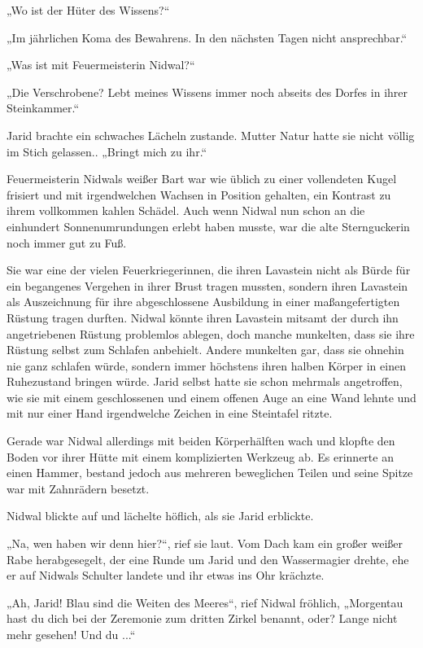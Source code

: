 „Wo ist der Hüter des Wissens?“

„Im jährlichen Koma des Bewahrens. In den nächsten Tagen nicht ansprechbar.“

„Was ist mit Feuermeisterin Nidwal?“

„Die Verschrobene? Lebt meines Wissens immer noch abseits des Dorfes in ihrer Steinkammer.“

Jarid brachte ein schwaches Lächeln zustande. Mutter Natur hatte sie nicht völlig im Stich gelassen.. „Bringt mich zu ihr.“



\trennzeichen



Feuermeisterin Nidwals weißer Bart war wie üblich zu einer vollendeten Kugel frisiert und mit irgendwelchen Wachsen in Position gehalten, ein Kontrast zu ihrem vollkommen kahlen Schädel. Auch wenn Nidwal nun schon an die einhundert Sonnenumrundungen erlebt haben musste, war die alte Sternguckerin noch immer gut zu Fuß.

Sie war eine der vielen Feuerkriegerinnen, die ihren Lavastein nicht als Bürde für ein begangenes Vergehen in ihrer Brust tragen mussten, sondern ihren Lavastein als Auszeichnung für ihre abgeschlossene Ausbildung in einer maßangefertigten Rüstung tragen durften. Nidwal könnte ihren Lavastein mitsamt der durch ihn angetriebenen Rüstung problemlos ablegen, doch manche munkelten, dass sie ihre Rüstung selbst zum Schlafen anbehielt. Andere munkelten gar, dass sie ohnehin nie ganz schlafen würde, sondern immer höchstens ihren halben Körper in einen Ruhezustand bringen würde. Jarid selbst hatte sie schon mehrmals angetroffen, wie sie mit einem geschlossenen und einem offenen Auge an eine Wand lehnte und mit nur einer Hand irgendwelche Zeichen in eine Steintafel ritzte.

Gerade war Nidwal allerdings mit beiden Körperhälften wach und klopfte den Boden vor ihrer Hütte mit einem komplizierten Werkzeug ab. Es erinnerte an einen Hammer, bestand jedoch aus mehreren beweglichen Teilen und seine Spitze war mit Zahnrädern besetzt.

Nidwal blickte auf und lächelte höflich, als sie Jarid erblickte.

„Na, wen haben wir denn hier?“, rief sie laut. Vom Dach kam ein großer weißer Rabe herabgesegelt, der eine Runde um Jarid und den Wassermagier drehte, ehe er auf Nidwals Schulter landete und ihr etwas ins Ohr krächzte.

„Ah, Jarid! Blau sind die Weiten des Meeres“, rief Nidwal fröhlich, „Morgentau hast du dich bei der Zeremonie zum dritten Zirkel benannt, oder? Lange nicht mehr gesehen! Und du ...“

